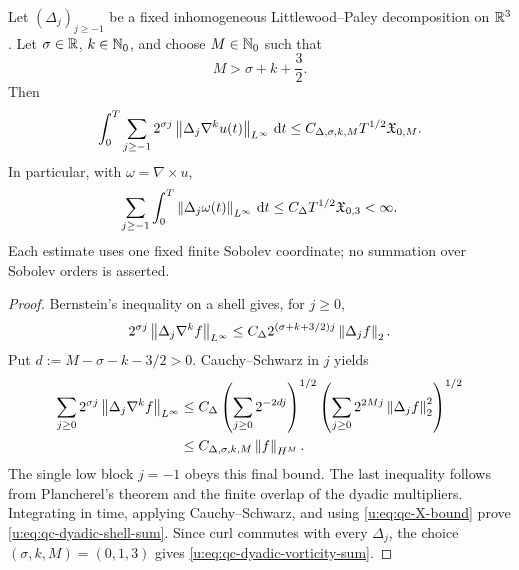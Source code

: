 \begin{proposition}
\label{u:prop:qc-dyadic-shell-sums}
Let \((\Delta_j)_{j\ge-1}\) be a fixed inhomogeneous
Littlewood--Paley decomposition on \(\mathbb R^3\).  Let
\(\sigma\in\mathbb R\), \(k\in\mathbb N_0\), and choose \(M\in\mathbb N_0\) such that
\begin{equation}
 M>\sigma+k+\frac32.
 \label{u:eq:qc-dyadic-order-condition}
\end{equation}
Then
\begin{equation}
 \int_0^T\sum_{j\ge-1}2^{\sigma j}
 \left\lVert \Delta_j\nabla^ku(t)\right\rVert_{L^\infty}\,\mathrm d t
 \le C_{\Delta,\sigma,k,M}T^{1/2}\mathfrak X_{0,M}.
 \label{u:eq:qc-dyadic-shell-sum}
\end{equation}
In particular, with \(\omega=\nabla\times u\),
\begin{equation}
 \sum_{j\ge-1}\int_0^T
 \left\lVert \Delta_j\omega(t)\right\rVert_{L^\infty}\,\mathrm d t
 \le C_\Delta T^{1/2}\mathfrak X_{0,3}<\infty.
 \label{u:eq:qc-dyadic-vorticity-sum}
\end{equation}
Each estimate uses one fixed finite Sobolev coordinate; no summation over
Sobolev orders is asserted.
\end{proposition}

\begin{proof}
Bernstein's inequality on a shell gives, for \(j\ge0\),
\[
 2^{\sigma j}\left\lVert \Delta_j\nabla^kf\right\rVert_{L^\infty}
 \le C_\Delta 2^{(\sigma+k+3/2)j}\left\lVert \Delta_jf\right\rVert_2.
\]
Put \(d:=M-\sigma-k-3/2>0\).  Cauchy--Schwarz in \(j\) yields
\begin{align*}
 \sum_{j\ge0}2^{\sigma j}
 \left\lVert \Delta_j\nabla^kf\right\rVert_{L^\infty}
 &\le C_\Delta
 \left(\sum_{j\ge0}2^{-2dj}\right)^{1/2}
 \left(\sum_{j\ge0}2^{2Mj}\left\lVert \Delta_jf\right\rVert_2^2\right)^{1/2}\\
 &\le C_{\Delta,\sigma,k,M}\left\lVert f\right\rVert_{H^M}.
\end{align*}
The single low block \(j=-1\) obeys this final bound.  The last
inequality follows from Plancherel's theorem and the finite overlap of the
dyadic multipliers.  Integrating in time, applying Cauchy--Schwarz, and using
\eqref{u:eq:qc-X-bound} prove \eqref{u:eq:qc-dyadic-shell-sum}.  Since curl
commutes with every \(\Delta_j\), the choice
\((\sigma,k,M)=(0,1,3)\) gives
\eqref{u:eq:qc-dyadic-vorticity-sum}.
\end{proof}

